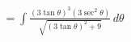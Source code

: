 \documentclass[preview]{standalone}
\begin{document}
\begin{align*}
&= \int \frac{(3\tan\theta)^3(3\sec^2\theta)}{\sqrt{(3\tan\theta)^2+9}} \, d\theta \\
\end{align*}
\end{document}
